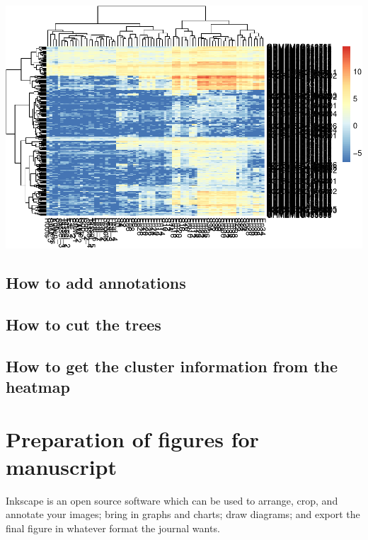\documentclass[]{book}
\begin{document}
\includegraphics{bioinfBookXIE186_files/figure-latex/unnamed-chunk-96-1.pdf}

\hypertarget{how-to-add-annotations}{%
\section{How to add annotations}\label{how-to-add-annotations}}

\hypertarget{how-to-cut-the-trees}{%
\section{How to cut the trees}\label{how-to-cut-the-trees}}

\hypertarget{how-to-get-the-cluster-information-from-the-heatmap}{%
\section{How to get the cluster information from the heatmap}\label{how-to-get-the-cluster-information-from-the-heatmap}}

\hypertarget{section-1}{%
\section{}\label{section-1}}

\hypertarget{preparation-of-figures-for-manuscript}{%
\chapter{Preparation of figures for manuscript}\label{preparation-of-figures-for-manuscript}}

Inkscape is an open source software which can be used to arrange, crop, and annotate your images; bring in graphs and charts; draw diagrams; and export the final figure in whatever format the journal wants.
\end{document}
